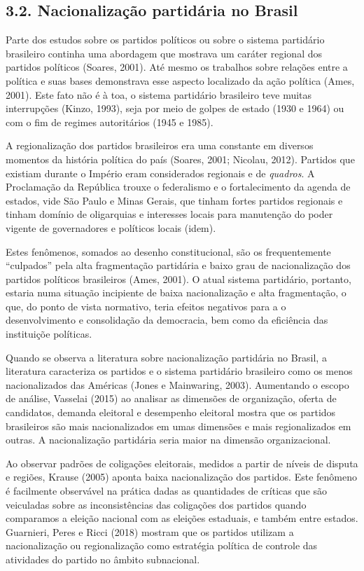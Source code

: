 \documentclass[]{article}
\begin{document}
\subsection{3.2. Nacionalização partidária no
Brasil}\label{nacionalizacao-partidaria-no-brasil}

Parte dos estudos sobre os partidos políticos ou sobre o sistema
partidário brasileiro continha uma abordagem que mostrava um caráter
regional dos partidos políticos (Soares, 2001). Até mesmo os trabalhos
sobre relações entre a política e suas bases demonstrava esse aspecto
localizado da ação política (Ames, 2001). Este fato não é à toa, o
sistema partidário brasileiro teve muitas interrupções (Kinzo, 1993),
seja por meio de golpes de estado (1930 e 1964) ou com o fim de regimes
autoritários (1945 e 1985).

A regionalização dos partidos brasileiros era uma constante em diversos
momentos da história política do país (Soares, 2001; Nicolau, 2012).
Partidos que existiam durante o Império eram considerados regionais e de
\emph{quadros}. A Proclamação da República trouxe o federalismo e o
fortalecimento da agenda de estados, vide São Paulo e Minas Gerais, que
tinham fortes partidos regionais e tinham domínio de oligarquias e
interesses locais para manutenção do poder vigente de governadores e
políticos locais (idem).

Estes fenômenos, somados ao desenho constitucional, são os
frequentemente ``culpados'' pela alta fragmentação partidária e baixo
grau de nacionalização dos partidos políticos brasileiros (Ames, 2001).
O atual sistema partidário, portanto, estaria numa situação incipiente
de baixa nacionalização e alta fragmentação, o que, do ponto de vista
normativo, teria efeitos negativos para a o desenvolvimento e
consolidação da democracia, bem como da eficiência das instituiçõe
políticas.

Quando se observa a literatura sobre nacionalização partidária no
Brasil, a literatura caracteriza os partidos e o sistema partidário
brasileiro como os menos nacionalizados das Américas (Jones e
Mainwaring, 2003). Aumentando o escopo de análise, Vasselai (2015) ao
analisar as dimensões de organização, oferta de candidatos, demanda
eleitoral e desempenho eleitoral mostra que os partidos brasileiros são
mais nacionalizados em umas dimensões e mais regionalizados em outras. A
nacionalização partidária seria maior na dimensão organizacional.

Ao observar padrões de coligações eleitorais, medidos a partir de níveis
de disputa e regiões, Krause (2005) aponta baixa nacionalização dos
partidos. Este fenômeno é facilmente observável na prática dadas as
quantidades de críticas que são veiculadas sobre as inconsistências das
coligações dos partidos quando comparamos a eleição nacional com as
eleições estaduais, e também entre estados. Guarnieri, Peres e Ricci
(2018) mostram que os partidos utilizam a nacionalização ou
regionalização como estratégia política de controle das atividades do
partido no âmbito subnacional.
\end{document}
